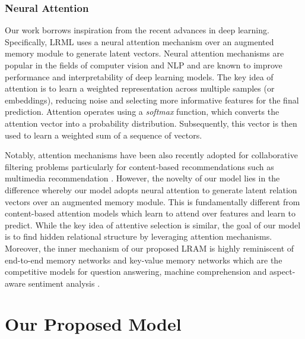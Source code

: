 \documentclass[sigconf]{acmart}
\begin{document}
 \subsubsection{Neural Attention} 
 Our work borrows inspiration from the recent advances in deep learning. Specifically, \textsc{LRML} uses a neural attention mechanism over an augmented memory module to generate latent vectors. Neural attention mechanisms are popular in the fields of computer vision \cite{DBLP:conf/nips/MnihHGK14,DBLP:conf/icml/XuBKCCSZB15} and NLP \cite{rocktaschel2015reasoning,luong2015effective,1712.05403,DBLP:conf/cikm/PhanSTHL17,DBLP:journals/corr/abs-1801-00102} and are known to improve performance and interpretability of deep learning models. The key idea of attention is to learn a weighted representation across multiple samples (or embeddings), reducing noise and selecting more informative features for the final prediction. Attention operates using a \textit{softmax} function, which converts the attention vector into a probability distribution. Subsequently, this vector is then used to learn a weighted sum of a sequence of vectors. 

 Notably, attention mechanisms have been also recently adopted for collaborative filtering problems particularly for content-based recommendations such as multimedia recommendation \cite{DBLP:conf/sigir/ChenZ0NLC17}. However, the novelty of our model lies in the difference whereby our model adopts neural attention to generate latent relation vectors over an augmented memory module. This is fundamentally different from content-based attention models which learn to attend over features and learn to predict. While the key idea of attentive selection is similar, the goal of our model is to find hidden relational structure by leveraging attention mechanisms. Moreover, the inner mechanism of our proposed LRAM is highly reminiscent of end-to-end memory networks \cite{DBLP:conf/nips/SukhbaatarSWF15} and key-value memory networks \cite{miller2016key} which are the competitive models for question answering, machine comprehension and aspect-aware sentiment analysis \cite{DBLP:conf/cikm/TayTH17}.

\section{Our Proposed Model}
\end{document}
